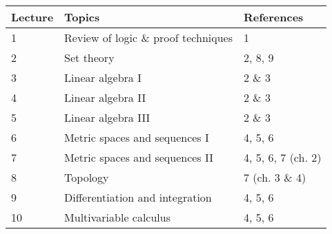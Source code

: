 \documentclass[12pt]{article}
\begin{document}
\begin{longtable}{| p{1.5cm}  | p{8cm} | p{3cm} |}
\hline
{\bf{Lecture}}  & {\bf{Topics}} &  {\bf{References}} \\
\hline
1  & Review of logic \& proof techniques &  1 \\
\hline
2  & Set theory & 2, 8, 9 \\
\hline
3 &  Linear algebra I & 2 \& 3 \\
\hline
4  &  Linear algebra II & 2 \& 3  \\
\hline
5  & Linear algebra III &  2 \& 3 \\
\hline
6  &  Metric spaces and sequences I &  4, 5, 6\\
\hline
7  & Metric spaces and sequences II & 4, 5, 6, 7 (ch. 2)  \\
\hline
8  & Topology & 7 (ch. 3 \& 4) \\
 \hline
9  &  Differentiation and integration &  4, 5, 6 \\
\hline
10  &   Multivariable calculus & 4, 5, 6 \\
\hline
\end{longtable}
\end{document}
